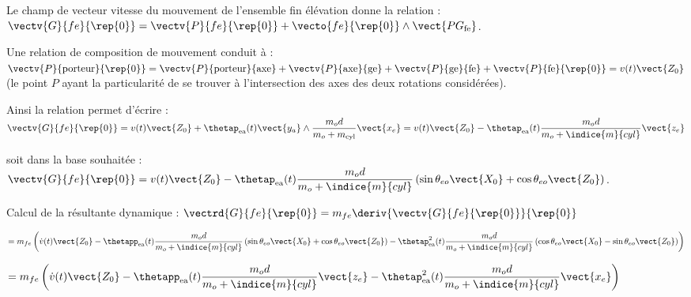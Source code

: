 \ifprof
\begin{corrige}
Le champ de vecteur vitesse du mouvement de l'ensemble fin élévation donne la relation :
$\vectv{G}{fe}{\rep{0}} = \vectv{P}{fe}{\rep{0}} +\vecto{fe}{\rep{0}} \wedge \vect{PG_{\text{fe}}} $.

Une relation de composition de mouvement conduit à : 
$\vectv{P}{\text{porteur}}{\rep{0}} = 
\vectv{P}{\text{porteur}}{\text{axe}} 
+\vectv{P}{\text{axe}}{\text{ge}} 
+\vectv{P}{\text{ge}}{\text{fe}} 
+\vectv{P}{\text{fe}}{\rep{0}} = v(t) \vect{Z_0} $
 (le point $P$ ayant la particularité de se trouver à l'intersection des axes des deux rotations considérées).

Ainsi la relation permet d'écrire :  
$\vectv{G}{fe}{\rep{0}} 
= v(t)\vect{Z_0} + \thetap_{\text{ea}}(t)\vect{y_a}\wedge \dfrac{m_o d}{m_o + m_{\text{cyl}}} \vect{x_e}
=v(t)\vect{Z_0}-\thetap_{\text{ea}}(t) \dfrac{m_o d}{m_o+\indice{m}{cyl}} \vect{z_e}$

soit dans la base souhaitée :  $\vectv{G}{fe}{\rep{0}} 
=v(t)\vect{Z_0}-\thetap_{\text{ea}}(t) \dfrac{m_o d}{m_o+\indice{m}{cyl}} \left(\sin\theta_{eo}\vect{X_0}+\cos\theta_{eo}\vect{Z_0} \right)$.
\end{corrige}
\else
\fi

\ifprof
\begin{corrige}
Calcul de la résultante dynamique : $\vectrd{G}{fe}{\rep{0}} =m_{fe}\deriv{\vectv{G}{fe}{\rep{0}}}{\rep{0}}$ 

$ = m_{fe}\left(
 \dot{v}(t)\vect{Z_0}
-\thetapp_{\text{ea}}(t) \dfrac{m_o d}{m_o+\indice{m}{cyl}} \left(\sin\theta_{eo}\vect{X_0}+\cos\theta_{eo}\vect{Z_0} \right)
-\thetap^2_{\text{ea}}(t) \dfrac{m_o d}{m_o+\indice{m}{cyl}} \left(\cos\theta_{eo}\vect{X_0}-\sin\theta_{eo}\vect{Z_0} \right)\right)$ 


$ = m_{fe}\left(
 \dot{v}(t)\vect{Z_0}
-\thetapp_{\text{ea}}(t) \dfrac{m_o d}{m_o+\indice{m}{cyl}}\vect{z_e}
-\thetap^2_{\text{ea}}(t) \dfrac{m_o d}{m_o+\indice{m}{cyl}}\vect{x_e}\right)
$ 
\end{corrige}
\else
\fi

